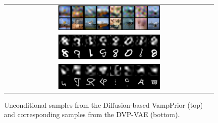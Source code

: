  \begin{figure}[t]
 \begin{center}
    \begin{tabular}{c}
        \includegraphics[width=0.5\textwidth]{pics/5_dvp/cifar10_dct_prior_samples.pdf} \\
        \includegraphics[width=0.5\textwidth]{pics/5_dvp/mnist_dct_prior_samples.pdf} \\
        \includegraphics[width=0.5\textwidth]{pics/5_dvp/omniglot_dct_prior_samples.pdf} \\
    \end{tabular}
    \end{center}
    \caption{Unconditional samples from the Diffusion-based VampPrior (top) and corresponding samples from the DVP-VAE (bottom).}
    \label{fig:dct_samples}
    \vskip 20pt
\end{figure}

